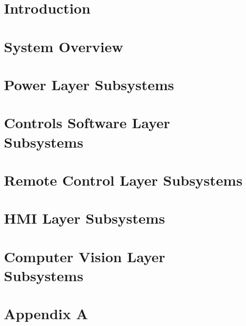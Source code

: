 \documentclass[11pt,letterpaper]{article}
\begin{document}
\setcounter{tocdepth}{2}
\tableofcontents
\newpage

\listoffigures
\listoftables
\newpage

\section{Introduction}

\section{System Overview}

\newpage
%
\newpage
\section{Power Layer Subsystems}

\newpage
\section{Controls Software Layer Subsystems}

\newpage
\section{Remote Control Layer Subsystems}

\newpage
\section{HMI Layer Subsystems}

\newpage
\section{Computer Vision Layer Subsystems}

\newpage
\section{Appendix A}

\newpage



{}
\end{document}

